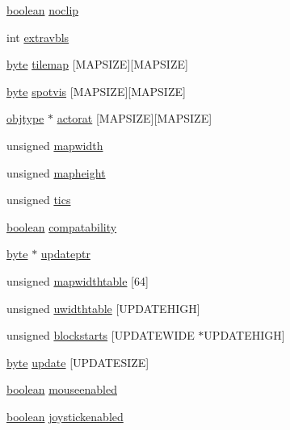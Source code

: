 \begin{DoxyCompactItemize}
\hyperlink{ID__HEAD_8H_a7c6368b321bd9acd0149b030bb8275ed}{boolean} \hyperlink{WL__PLAY_8C_aad83c32aa52b632f075c971e15ac0180}{noclip}
\item 
int \hyperlink{WL__PLAY_8C_abb2d216c89203065d594e55c09f500d5}{extravbls}
\item 
\hyperlink{ID__HEAD_8H_a0c8186d9b9b7880309c27230bbb5e69d}{byte} \hyperlink{WL__PLAY_8C_a71276ae4f97677e43033f2f6103b8720}{tilemap} \mbox{[}MAPSIZE\mbox{]}\mbox{[}MAPSIZE\mbox{]}
\item 
\hyperlink{ID__HEAD_8H_a0c8186d9b9b7880309c27230bbb5e69d}{byte} \hyperlink{WL__PLAY_8C_a4d17a83d6ebae084e33130e818311b0f}{spotvis} \mbox{[}MAPSIZE\mbox{]}\mbox{[}MAPSIZE\mbox{]}
\item 
\hyperlink{structobjstruct}{objtype} $\ast$ \hyperlink{WL__PLAY_8C_a8b6c7ec70ee351719afac0dd216445c7}{actorat} \mbox{[}MAPSIZE\mbox{]}\mbox{[}MAPSIZE\mbox{]}
\item 
unsigned \hyperlink{WL__PLAY_8C_a18042bb0860852b7365837e7fb7366c1}{mapwidth}
\item 
unsigned \hyperlink{WL__PLAY_8C_aa57a71a17124e3d1995584f7b4fe1ca0}{mapheight}
\item 
unsigned \hyperlink{WL__PLAY_8C_a2b5fccfe4a509a1a5f685bb7b7399997}{tics}
\item 
\hyperlink{ID__HEAD_8H_a7c6368b321bd9acd0149b030bb8275ed}{boolean} \hyperlink{WL__PLAY_8C_ac82e52209129dcc9cad9d8c8d6b2a77a}{compatability}
\item 
\hyperlink{ID__HEAD_8H_a0c8186d9b9b7880309c27230bbb5e69d}{byte} $\ast$ \hyperlink{WL__PLAY_8C_a120692504a35218a45eabb70ed0e4fe7}{updateptr}
\item 
unsigned \hyperlink{WL__PLAY_8C_a2aec10bd4a21a6d0178fbdd701ab0fb9}{mapwidthtable} \mbox{[}64\mbox{]}
\item 
unsigned \hyperlink{WL__PLAY_8C_af6ce3eaaf641bdbacc8cd7e98eaa90b9}{uwidthtable} \mbox{[}UPDATEHIGH\mbox{]}
\item 
unsigned \hyperlink{WL__PLAY_8C_a55e89f395ced8a12eba2634336292526}{blockstarts} \mbox{[}UPDATEWIDE $\ast$UPDATEHIGH\mbox{]}
\item 
\hyperlink{ID__HEAD_8H_a0c8186d9b9b7880309c27230bbb5e69d}{byte} \hyperlink{WL__PLAY_8C_a377ee66e839b90ae7140bb0dbde6c696}{update} \mbox{[}UPDATESIZE\mbox{]}
\item 
\hyperlink{ID__HEAD_8H_a7c6368b321bd9acd0149b030bb8275ed}{boolean} \hyperlink{WL__PLAY_8C_a36b9d776c596f97e2f6fac5bcc96fad3}{mouseenabled}
\item 
\hyperlink{ID__HEAD_8H_a7c6368b321bd9acd0149b030bb8275ed}{boolean} \hyperlink{WL__PLAY_8C_aedd645e0ac8f3dd90af15172766bb406}{joystickenabled}

\end{DoxyCompactItemize}
